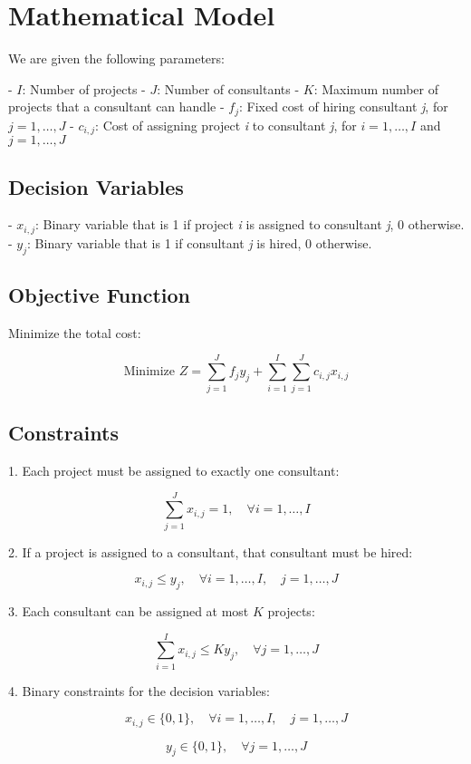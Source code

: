 \documentclass{article}
\begin{document}
\section*{Mathematical Model}

We are given the following parameters:

- \( I \): Number of projects
- \( J \): Number of consultants
- \( K \): Maximum number of projects that a consultant can handle
- \( f_j \): Fixed cost of hiring consultant \textit{j}, for \( j = 1, \ldots, J \)
- \( c_{i,j} \): Cost of assigning project \textit{i} to consultant \textit{j}, for \( i = 1, \ldots, I \) and \( j = 1, \ldots, J \)

\subsection*{Decision Variables}

- \( x_{i,j} \): Binary variable that is 1 if project \textit{i} is assigned to consultant \textit{j}, 0 otherwise.
- \( y_j \): Binary variable that is 1 if consultant \textit{j} is hired, 0 otherwise.

\subsection*{Objective Function}

Minimize the total cost:

\[
\text{Minimize } Z = \sum_{j=1}^{J} f_j y_j + \sum_{i=1}^{I} \sum_{j=1}^{J} c_{i,j} x_{i,j}
\]

\subsection*{Constraints}

1. Each project must be assigned to exactly one consultant:

\[
\sum_{j=1}^{J} x_{i,j} = 1, \quad \forall i = 1, \ldots, I
\]

2. If a project is assigned to a consultant, that consultant must be hired:

\[
x_{i,j} \leq y_j, \quad \forall i = 1, \ldots, I, \quad j = 1, \ldots, J
\]

3. Each consultant can be assigned at most \( K \) projects:

\[
\sum_{i=1}^{I} x_{i,j} \leq K y_j, \quad \forall j = 1, \ldots, J
\]

4. Binary constraints for the decision variables:

\[
x_{i,j} \in \{0, 1\}, \quad \forall i = 1, \ldots, I, \quad j = 1, \ldots, J
\]

\[
y_j \in \{0, 1\}, \quad \forall j = 1, \ldots, J
\]
\end{document}
